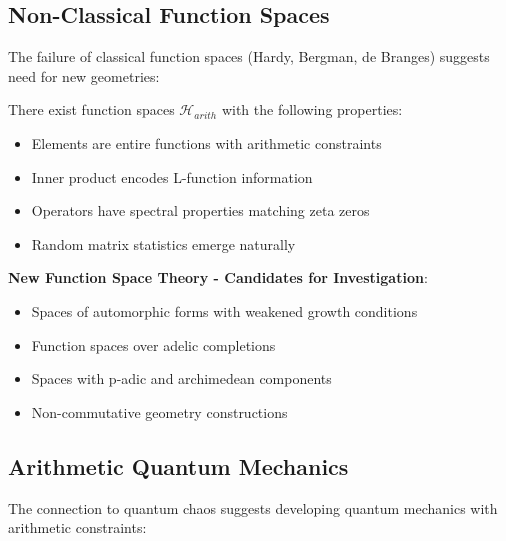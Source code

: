 \subsection{Non-Classical Function Spaces}
\label{subsec:nonclassical_spaces}

The failure of classical function spaces (Hardy, Bergman, de Branges) suggests need for new geometries:

\begin{conjecture}
There exist function spaces $\mathcal{H}_{arith}$ with the following properties:
\begin{itemize}
\item Elements are entire functions with arithmetic constraints
\item Inner product encodes L-function information
\item Operators have spectral properties matching zeta zeros
\item Random matrix statistics emerge naturally
\end{itemize}
\end{conjecture}

\noindent\textbf{New Function Space Theory - Candidates for Investigation}:
\begin{itemize}
\item Spaces of automorphic forms with weakened growth conditions
\item Function spaces over adelic completions
\item Spaces with p-adic and archimedean components
\item Non-commutative geometry constructions
\end{itemize}

\subsection{Arithmetic Quantum Mechanics}
\label{subsec:arithmetic_quantum}

The connection to quantum chaos suggests developing quantum mechanics with arithmetic constraints:

